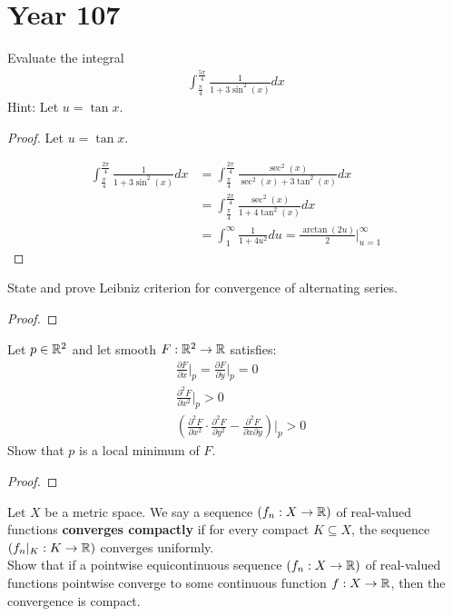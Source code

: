 \documentclass{report}
\begin{document}
\section{Year 107}
\begin{question}{}{}
Evaluate the integral
\begin{align*}
\int^{\frac{5\pi }{4} }_{\frac{\pi }{4}} \frac{1}{1+3 \sin^2(x)}dx
\end{align*}
Hint: Let $u=\tan x$. 
\end{question}
\begin{proof}
Let $u=\tan x$. 

\begin{align*}
\int^{\frac{2\pi }{4} }_{\frac{\pi }{4}} \frac{1}{1+3 \sin^2(x)}dx&=\int^{\frac{2\pi }{4} }_{\frac{\pi }{4}} \frac{\sec^2 (x)}{\sec^2(x)+3 \tan^2(x)}dx \\
&=\int^{\frac{2\pi }{4} }_{\frac{\pi }{4}} \frac{\sec^2 (x)}{1+ 4\tan^2(x)}dx  \\
&=\int_{1}^{\infty} \frac{1}{1+4u^2}du = \frac{ \arctan (2u)}{2} \Big|_{u=1}^{\infty} 
\end{align*}
\end{proof}
\begin{question}{}{}
State and prove Leibniz criterion for convergence of alternating series. 
\end{question}
\begin{proof}

\end{proof}
\begin{question}{}{}
Let $p \in\mathbb{R}^2$ and let smooth $F:\mathbb{R}^2\rightarrow \mathbb{R}$ satisfies: 
\begin{align*}
  &\frac{\partial F}{\partial x}\Bigg|_p=\frac{\partial F}{\partial y}\Bigg|_p=0\\
  &\frac{\partial^2 F}{\partial x^2}\Bigg|_p>0   \\
  &\left( \frac{\partial^2 F}{\partial x^2} \cdot \frac{\partial ^2 F}{\partial y^2} - \frac{\partial^2 F}{\partial x\partial y}\right) \Bigg|_p >0
\end{align*}
Show that $p$ is a local minimum of  $F$. 
\end{question}
\begin{proof}

\end{proof}
\begin{question}{}{}
Let $X$ be a metric space. We say a  sequence  $(f_n:X\rightarrow \mathbb{R})$ of real-valued functions \textbf{converges compactly} if for every compact $K \subseteq X$, the sequence $(f_n|_K:K\rightarrow \mathbb{R})$ converges uniformly. \\

Show that if a pointwise equicontinuous sequence $(f_n:X\rightarrow \mathbb{R})$ of real-valued functions pointwise converge to some continuous function $f:X\rightarrow \mathbb{R}$, then the convergence is compact.  
\end{question}
\end{document}
